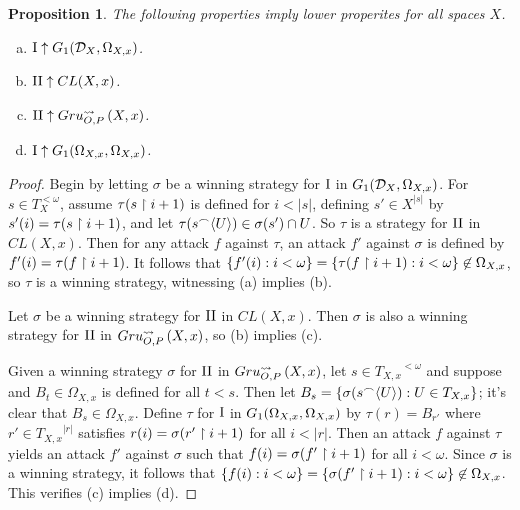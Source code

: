 \documentclass{amsart}
\theoremstyle{plain}
\newtheorem{proposition}[theorem]{Proposition}
\theoremstyle{definition}
\theoremstyle{remark}
\theoremstyle{plain}
\theoremstyle{definition}
\theoremstyle{remark}
\begin{document}
\begin{proposition}
The following properties imply lower properites for all spaces \(X\).
 \begin{enumerate}[a)]
  \item \(\mathrm{I}\uparrow G_{1}(\mathcal{D}_X,\Omega_{X,x})\).
  \item \(\mathrm{II}\uparrow CL(X,x)\).
  \item \(\mathrm{II}\uparrow Gru_{O,P}^{\leadsto}\left({X},{x}\right)\).
  \item \(\mathrm{I}\uparrow G_{1}(\Omega_{X,x},\Omega_{X,x})\).
 \end{enumerate}
\end{proposition}
\begin{proof}
 Begin by letting \(\sigma\) be a winning strategy for \(\mathrm{I}\) in \(G_{1}(\mathcal{D}_X,\Omega_{X,x})\). 
 For \(s\in T_{X}^{<\omega}\), assume \(\tau(s\restriction i+1)\) is defined for \(i<|s|\), defining \(s'\in X^{|s|}\) by \(s'(i)=\tau(s\restriction i+1)\), and let \(\tau(s{^\frown}\langle U\rangle)\in\sigma(s')\cap U\). 
 So \(\tau\) is a strategy for \(\mathrm{II}\) in \(CL(X,x)\). Then for any attack \(f\) against \(\tau\), an attack \(f'\) against \(\sigma\) is defined by \(f'(i)=\tau(f\restriction i+1)\). 
 It follows that \(\{f'(i):i<\omega\}=\{\tau(f\restriction i+1):i<\omega\}\not\in\Omega_{X,x}\), so \(\tau\) is a winning strategy, witnessing (a) implies (b).

 Let \(\sigma\) be a winning strategy for \(\mathrm{II}\) in \(CL(X,x)\). 
 Then \(\sigma\) is also a winning strategy for \(\mathrm{II}\) in \(Gru_{O,P}^{\leadsto}\left({X},{x}\right)\), so (b) implies (c).

 Given a winning strategy \(\sigma\) for \(\mathrm{II}\) in \(Gru_{O,P}^{\leadsto}\left({X},{x}\right)\), let \(s\in {T_{X,x}}^{<\omega}\) and suppose and \(B_t\in\Omega_{X,x}\) is defined for all \(t<s\). 
 Then let \(B_s=\{\sigma(s{^\frown}\langle U\rangle):U\in T_{X,x}\}\); it's clear that \(B_s\in\Omega_{X,x}\). 
 Define \(\tau\) for \(\mathrm{I}\) in \(G_{1}(\Omega_{X,x},\Omega_{X,x})\) by \(\tau(r)=B_{r'}\) where \(r'\in {T_{X,x}}^{|r|}\) satisfies \(r(i)=\sigma(r'\restriction i+1)\) for all \(i<|r|\). 
 Then an attack \(f\) against \(\tau\) yields an attack \(f'\) against \(\sigma\) such that \(f(i)=\sigma(f'\restriction i+1)\) for all \(i<\omega\). 
 Since \(\sigma\) is a winning strategy, it follows that \(\{f(i):i<\omega\}=\{\sigma(f'\restriction i+1):i<\omega\}\not\in\Omega_{X,x}\). 
 This verifies (c) implies (d).
\end{proof}
\end{document}
